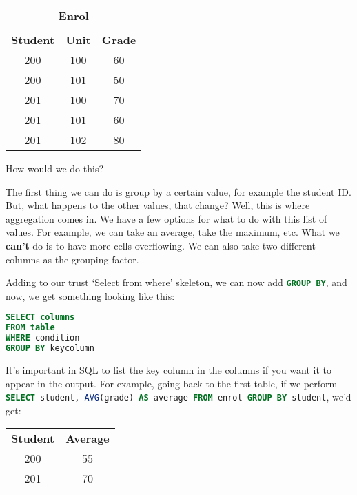 \documentclass[11pt,a4paper,titlepage,dvipsnames,cmyk]{scrartcl}
\begin{document}
\begin{center}
    \begin{tabular}{|c|c|c|}
        \multicolumn{3}{c}{\textbf{Enrol}} \\
        \multicolumn{3}{c}{} \\
        \hline
        \textbf{Student} & \textbf{Unit} & \textbf{Grade} \\
        \hhline{|=|=|=|}
        200 & 100 & 60 \\ \hline
        200 & 101 & 50 \\ \hline
        201 & 100 & 70 \\ \hline
        201 & 101 & 60 \\ \hline
        201 & 102 & 80 \\ \hline
    \end{tabular}
\end{center}

How would we do this?

\begin{minipage}{\textwidth}
The first thing we can do is group by a certain value, for example the
student ID. But, what happens to the other values, that change? Well, this
is where aggregation comes in. We have a few options for what to do with
this list of values. For example, we can take an average, take the
maximum, etc. What we \textbf{can't} do is to have more cells overflowing.
We can also take two different columns as the grouping factor.
\end{minipage}

Adding to our trust `Select from where' skeleton, we can now add
\lstinline[language=SQL]|GROUP BY|, and now, we get something looking like this:

\begin{lstlisting}[language=SQL]
SELECT columns
FROM table
WHERE condition
GROUP BY keycolumn
\end{lstlisting}

It's important in SQL to list the key column in the columns if you want it
to appear in the output. For example, going back to the first table, if we
perform \lstinline[language=SQL]|SELECT student, AVG(grade) AS average FROM enrol GROUP BY student|, we'd get:

\begin{center}
    \begin{tabular}{|c|c|}
        \hline
        \textbf{Student} & \textbf{Average} \\ \hhline{|=|=|}
        200 & 55 \\ \hline
        201 & 70 \\ \hline
    \end{tabular}
\end{center}
\end{document}
